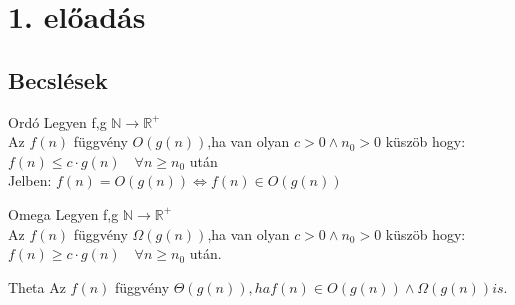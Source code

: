\section{1. előadás}
\subsection{Becslések}

\begin{definicio}{Ordó}
  Legyen f,g $\mathbb{N} \rightarrow \mathbb{R}^+$ \\
  					 Az $f(n)$ függvény $O(g(n))$,ha van olyan $c > 0 \land n_0 > 0$ küszöb hogy: \\
  					 $f(n) \leq c \cdot g(n)\quad \forall n \geq n_0$ után\\[3pt]
  					 Jelben: $f(n) = O(g(n)) \Leftrightarrow f(n) \in O(g(n))$ \\[0pt]
\end{definicio}

\begin{definicio}{Omega}
  		Legyen f,g $\mathbb{N} \rightarrow \mathbb{R}^+$ \\
  					 Az $f(n)$ függvény $\Omega (g(n))$,ha van olyan $c > 0 \land n_0 > 0$ küszöb hogy: \\
  					 $f(n) \geq c \cdot g(n)\quad \forall n \geq n_0$ után.\\[6pt]
\end{definicio}

\begin{definicio}{Theta}
  Az $f(n)$ függvény $\Theta (g(n)), ha f(n) \in O(g(n)) \land \Omega (g(n)) is.$
\end{definicio}
